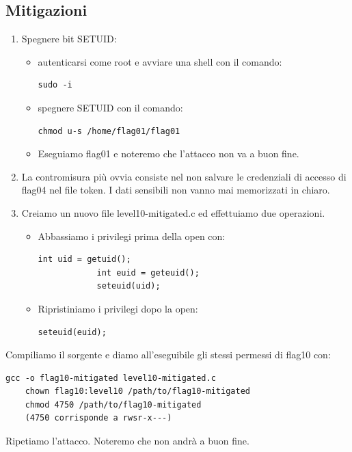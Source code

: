 \subsection{Mitigazioni}
\begin{enumerate}
    \item Spegnere bit SETUID:
    \begin{itemize}
        \item autenticarsi come root e avviare una shell con il comando: \begin{lstlisting}[style=bashstyle] 
        sudo -i
        \end{lstlisting}
        \item spegnere SETUID con il comando: \begin{lstlisting}[style=bashstyle] 
        chmod u-s /home/flag01/flag01
        \end{lstlisting}   
        \item Eseguiamo flag01 e noteremo che l’attacco non va a buon fine. 
    \end{itemize}
    \item La contromisura più ovvia consiste nel non salvare le credenziali di accesso di flag04 nel file token. I dati sensibili non vanno mai memorizzati in chiaro.
    \item Creiamo un nuovo file level10-mitigated.c ed effettuiamo due operazioni.
    \begin{itemize}
        \item Abbassiamo i privilegi prima della open con:
        \begin{lstlisting}[style=cstyle]
            int uid = getuid();
            int euid = geteuid();
            seteuid(uid);
        \end{lstlisting}
        \item Ripristiniamo i privilegi dopo la open:
        \begin{lstlisting}[style=cstyle]
            seteuid(euid);
        \end{lstlisting}
    \end{itemize}
\end{enumerate}
Compiliamo il sorgente e diamo all'eseguibile gli stessi permessi di flag10 con:
\begin{lstlisting}[style=bashstyle]
    gcc -o flag10-mitigated level10-mitigated.c
    chown flag10:level10 /path/to/flag10-mitigated 
    chmod 4750 /path/to/flag10-mitigated
    (4750 corrisponde a rwsr-x---)
    \end{lstlisting}
Ripetiamo l'attacco. Noteremo che non andrà a buon fine.

